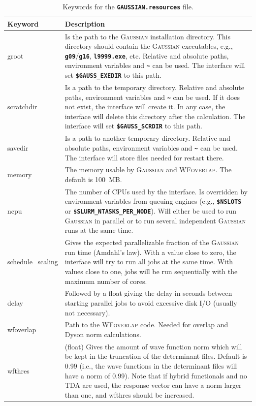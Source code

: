 \documentclass[a4paper,10pt,DIV=15,openany]{scrbook}
\newcommand{\ttt}[1]{\textbf{\texttt{#1}}}
\begin{document}
\begin{table}
  \centering
  \caption{Keywords for the \ttt{GAUSSIAN.resources} file.}
  \label{tab:gauss_sh2}
  \begin{tabular}{>{\ttfamily}lp{12cm}}
  \hline
  Keyword       &Description\\
  \hline
groot                   &Is the path to the \textsc{Gaussian} installation directory. This directory should contain the \textsc{Gaussian} executables, e.g., \ttt{g09}/\ttt{g16}, \ttt{l9999.exe}, etc. Relative and absolute paths, environment variables and \ttt{\textasciitilde} can be used. The interface will set \ttt{\$GAUSS\_EXEDIR} to this path. 
\\
scratchdir              &Is a path to the temporary directory. Relative and absolute paths, environment variables and \ttt{\textasciitilde} can be used. If it does not exist, the interface will create it. In any case, the interface will delete this directory after the calculation. The interface will set \ttt{\$GAUSS\_SCRDIR} to this path.
\\
savedir                 &Is a path to another temporary directory.  Relative and absolute paths, environment variables and \ttt{\textasciitilde} can be used. The interface will store files needed for restart there.
\\
memory                  &The memory usable by \textsc{Gaussian} and \textsc{WFoverlap}. The default is 100~MB. 
\\
ncpu                    &The number of CPUs used by the interface. Is overridden by environment variables from queuing engines (e.g., \ttt{\$NSLOTS} or \ttt{\$SLURM\_NTASKS\_PER\_NODE}). Will either be used to run \textsc{Gaussian} in parallel or to run several independent \textsc{Gaussian} runs at the same time.
\\
schedule\_scaling       &Gives the expected parallelizable fraction of the \textsc{Gaussian} run time (Amdahl's law). With a value close to zero, the interface will try to run all jobs at the same time. With values close to one, jobs will be run sequentially with the maximum number of cores.
\\
delay                   &Followed by a float giving the delay in seconds between starting parallel jobs to avoid excessive disk I/O (usually not necessary).
\\
wfoverlap               &Path to the \textsc{WFoverlap} code. Needed for overlap and Dyson norm calculations.
\\
wfthres                 &(float) Gives the amount of wave function norm which will be kept in the truncation of the determinant files. Default is 0.99 (i.e., the wave functions in the determinant files will have a norm of 0.99). Note that if hybrid functionals and no TDA are used, the response vector can have a norm larger than one, and wfthres should be increased.

\end{tabular}
\end{table}
\end{document}
